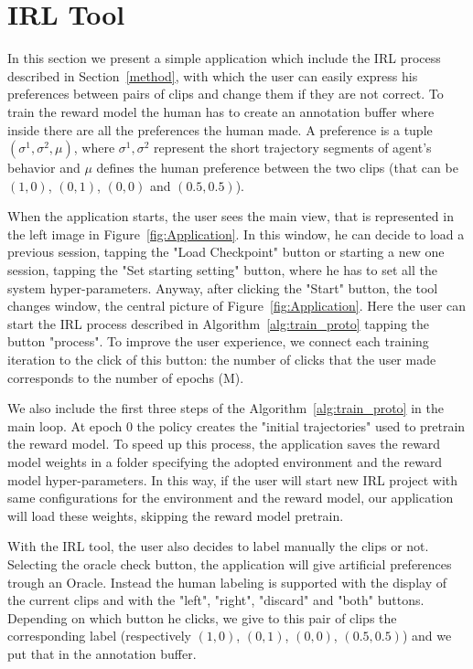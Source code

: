 \section{IRL Tool}\label{04}

In this section we present a simple application which include the IRL process described in Section\ \ref{method}, with which the user can easily express his preferences between pairs of clips and change them if they are not correct.
To train the reward model the human has to create an annotation buffer where inside there are all the preferences the human made. A preference is a tuple $( \sigma^1, \sigma^2, \mu)$, where $\sigma^1, \sigma^2$ represent the short trajectory segments of agent's behavior and $\mu$ defines the human preference between the two clips (that can be $(1, 0)$, $(0, 1)$, $(0, 0)$ and $(0.5, 0.5)$). 

When the application starts, the user sees the main view, that is represented in the left image in Figure\ \ref{fig:Application}.
In this window, he can decide to load a previous session, tapping the "Load Checkpoint" button or starting a new one session, tapping the "Set starting setting" button, where he has to set all the system hyper-parameters. Anyway, after clicking the "Start" button, the tool changes window, the central picture of Figure\ \ref{fig:Application}. Here the user can start the IRL process described in Algorithm\ \ref{alg:train_proto} tapping the button "process".
To improve the user experience, we connect each training iteration to the click of this button: the number of clicks that the user made corresponds to the number of epochs (M).

We also include the first three steps of the Algorithm\ \ref{alg:train_proto} in the main loop. At epoch $0$ the policy creates the "initial trajectories" used to pretrain the reward model. To speed up this process, the application saves the reward model weights in a folder specifying the adopted environment and the reward model hyper-parameters. In this way, if the user will start new IRL project with same configurations for the environment and the reward model, our application will load these weights, skipping the reward model pretrain.

With the IRL tool, the user also decides to label manually the clips or not. Selecting the oracle check button, the application will give artificial preferences trough an Oracle. Instead the human labeling is supported with the display of the current clips and with the "left", "right", "discard" and "both" buttons. Depending on which button he clicks, we give to this pair of clips the corresponding label (respectively $(1, 0)$, $(0, 1)$, $(0, 0)$, $(0.5, 0.5)$) and we put that in the annotation buffer. 


